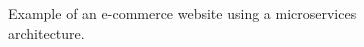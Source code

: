 \begin{figure}[]
  \centering
  
  \caption{Example of an e-commerce website using a microservices architecture.}
  \label{fig:microservices}
\end{figure}